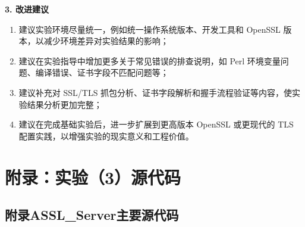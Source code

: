 ﻿\documentclass[12pt]{ctexart}
\begin{document}
\textbf{3. 改进建议}

\begin{enumerate}
    \item 建议实验环境尽量统一，例如统一操作系统版本、开发工具和 OpenSSL 版本，以减少环境差异对实验结果的影响；
    \item 建议在实验指导中增加更多关于常见错误的排查说明，如 Perl 环境变量问题、编译错误、证书字段不匹配问题等；
    \item 建议补充对 SSL/TLS 抓包分析、证书字段解析和握手流程验证等内容，使实验结果分析更加完整；
    \item 建议在完成基础实验后，进一步扩展到更高版本 OpenSSL 或更现代的 TLS 配置实践，以增强实验的现实意义和工程价值。
\end{enumerate}

\appendix
\section*{附录：实验（3）源代码}

\subsection*{附录A\quad SSL\_Server主要源代码}
\end{document}
